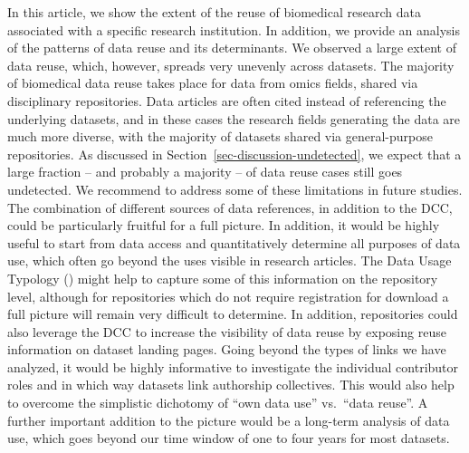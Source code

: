 \documentclass[
  letterpaper,
  DIV=11,
  numbers=noendperiod]{scrartcl}
\begin{document}
In this article, we show the extent of the reuse of biomedical research
data associated with a specific research institution. In addition, we
provide an analysis of the patterns of data reuse and its determinants.
We observed a large extent of data reuse, which, however, spreads very
unevenly across datasets. The majority of biomedical data reuse takes
place for data from omics fields, shared via disciplinary repositories.
Data articles are often cited instead of referencing the underlying
datasets, and in these cases the research fields generating the data are
much more diverse, with the majority of datasets shared via
general-purpose repositories. As discussed in
Section~\ref{sec-discussion-undetected}, we expect that a large fraction
-- and probably a majority -- of data reuse cases still goes undetected.
We recommend to address some of these limitations in future studies. The
combination of different sources of data references, in addition to the
DCC, could be particularly fruitful for a full picture. In addition, it
would be highly useful to start from data access and quantitatively
determine all purposes of data use, which often go beyond the uses
visible in research articles. The Data Usage Typology
() might
help to capture some of this information on the repository level,
although for repositories which do not require registration for download
a full picture will remain very difficult to determine. In addition,
repositories could also leverage the DCC to increase the visibility of
data reuse by exposing reuse information on dataset landing pages. Going
beyond the types of links we have analyzed, it would be highly
informative to investigate the individual contributor roles and in which
way datasets link authorship collectives. This would also help to
overcome the simplistic dichotomy of ``own data use'' vs.~``data
reuse''. A further important addition to the picture would be a
long-term analysis of data use, which goes beyond our time window of one
to four years for most datasets.
\end{document}
